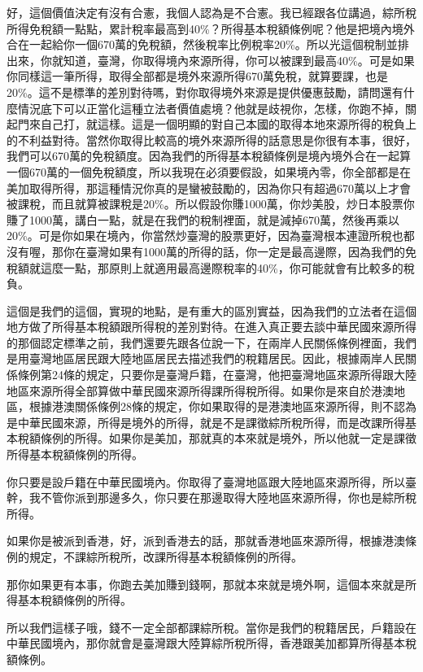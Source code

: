 \documentclass[]{ctexbook}
\begin{document}
好，這個價值決定有沒有合憲，我個人認為是不合憲。我已經跟各位講過，綜所稅所得免稅額一點點，累計稅率最高到40\%？所得基本稅額條例呢？他是把境內境外合在一起給你一個670萬的免稅額，然後稅率比例稅率20\%。所以光這個稅制並排出來，你就知道，臺灣，你取得境內來源所得，你可以被課到最高40\%。可是如果你同樣這一筆所得，取得全部都是境外來源所得670萬免稅，就算要課，也是20\%。這不是標準的差別對待嗎，對你取得境外來源是提供優惠鼓勵，請問還有什麼情況底下可以正當化這種立法者價值處境？他就是歧視你，怎樣，你跑不掉，關起門來自己打，就這樣。這是一個明顯的對自己本國的取得本地來源所得的稅負上的不利益對待。當然你取得比較高的境外來源所得的話意思是你很有本事，很好，我們可以670萬的免稅額度。因為我們的所得基本稅額條例是境內境外合在一起算一個670萬的一個免稅額度，所以我現在必須要假設，如果境內零，你全部都是在美加取得所得，那這種情況你真的是蠻被鼓勵的，因為你只有超過670萬以上才會被課稅，而且就算被課稅是20\%。所以假設你賺1000萬，你炒美股，炒日本股票你賺了1000萬，講白一點，就是在我們的稅制裡面，就是減掉670萬，然後再乘以20\%。可是你如果在境內，你當然炒臺灣的股票更好，因為臺灣根本連證所稅也都沒有喔，那你在臺灣如果有1000萬的所得的話，你一定是最高邊際，因為我們的免稅額就這麼一點，那原則上就適用最高邊際稅率的40\%，你可能就會有比較多的稅負。

這個是我們的這個，實現的地點，是有重大的區別實益，因為我們的立法者在這個地方做了所得基本稅額跟所得稅的差別對待。在進入真正要去談中華民國來源所得的那個認定標準之前，我們還要先跟各位說一下，在兩岸人民關係條例裡面，我們是用臺灣地區居民跟大陸地區居民去描述我們的稅籍居民。因此，根據兩岸人民關係條例第24條的規定，只要你是臺灣戶籍，在臺灣，他把臺灣地區來源所得跟大陸地區來源所得全部算做中華民國來源所得課所得稅所得。如果你是來自於港澳地區，根據港澳關係條例28條的規定，你如果取得的是港澳地區來源所得，則不認為是中華民國來源，所得是境外的所得，就是不是課徵綜所稅所得，而是改課所得基本稅額條例的所得。如果你是美加，那就真的本來就是境外，所以他就一定是課徵所得基本稅額條例的所得。

你只要是設戶籍在中華民國境內。你取得了臺灣地區跟大陸地區來源所得，所以臺幹，我不管你派到那邊多久，你只要在那邊取得大陸地區來源所得，你也是綜所稅所得。

如果你是被派到香港，好，派到香港去的話，那就香港地區來源所得，根據港澳條例的規定，不課綜所稅所，改課所得基本稅額條例的所得。

那你如果更有本事，你跑去美加賺到錢啊，那就本來就是境外啊，這個本來就是所得基本稅額條例的所得。

所以我們這樣子哦，錢不一定全部都課綜所稅。當你是我們的稅籍居民，戶籍設在中華民國境內，那你就會是臺灣跟大陸算綜所稅所得，香港跟美加都算所得基本稅額條例。
\end{document}

